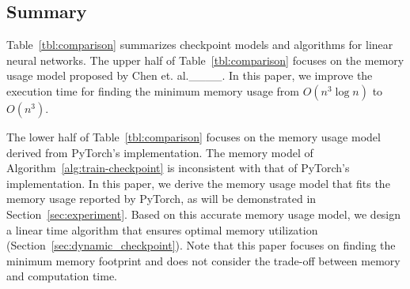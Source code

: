 \subsection{Summary}

Table~\ref{tbl:comparison} summarizes checkpoint models and algorithms for linear neural networks.
%
The upper half of Table~\ref{tbl:comparison} focuses on the memory usage model proposed by Chen et. al.____.
In this paper, we improve the execution time for finding the minimum memory usage from $O(n^3 \log n)$ to $O(n^3)$.

The lower half of Table~\ref{tbl:comparison} focuses on the memory usage model derived from PyTorch's implementation.
The memory model of Algorithm~\ref{alg:train-checkpoint} is inconsistent with that of PyTorch's implementation.
In this paper, we derive the memory usage model that fits the memory usage reported by PyTorch, as will be demonstrated in Section~\ref{sec:experiment}.
Based on this accurate memory usage model, we design a linear time algorithm that ensures optimal memory utilization (Section~\ref{sec:dynamic_checkpoint}).
Note that this paper focuses on finding the minimum memory footprint and does not consider the trade-off between memory and computation time.

